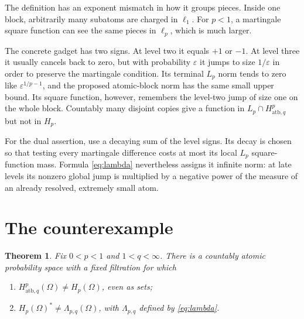 \documentclass[11pt]{article}
\newtheorem{theorem}{Theorem}
\newcommand{\1}{\mathbf 1}
\begin{document}
The definition has an exponent mismatch in how it groups pieces.  Inside one
block, arbitrarily many subatoms are charged in \(\ell_1\).  For \(p<1\), a
martingale square function can see the same pieces in \(\ell_p\), which is
much larger.

The concrete gadget has two signs.  At level two it equals \(+1\) or \(-1\).
At level three it usually cancels back to zero, but with probability
\(\varepsilon\) it jumps to size \(1/\varepsilon\) in order to preserve the
martingale condition.  Its terminal \(L_p\) norm tends to zero like
\(\varepsilon^{1/p-1}\), and the proposed atomic-block norm has the same
small upper bound.  Its square function, however, remembers the level-two
jump of size one on the whole block.  Countably many disjoint copies give a
function in \(L_p\cap H^p_{\mathrm{atb},q}\) but not in \(H_p\).

For the dual assertion, use a decaying sum of the level signs.  Its decay is
chosen so that testing every martingale difference costs at most its local
\(L_p\) square-function mass.  Formula \eqref{eq:lambda} nevertheless assigns
it infinite norm: at late levels its nonzero global jump is multiplied by a
negative power of the measure of an already resolved, extremely small atom.

\section{The counterexample}

\begin{theorem}\label{thm:main}
Fix \(0<p<1\) and \(1<q<\infty\).  There is a countably atomic probability
space with a fixed filtration for which
\begin{enumerate}[label=\textup{(\roman*)}]
\item \(H^p_{\mathrm{atb},q}(\Omega)\not=H_p(\Omega)\), even as sets;
\item \(H_p(\Omega)^*\not=\Lambda_{p,q}(\Omega)\), with
      \(\Lambda_{p,q}\) defined by \eqref{eq:lambda}.
\end{enumerate}
\end{theorem}
\end{document}
